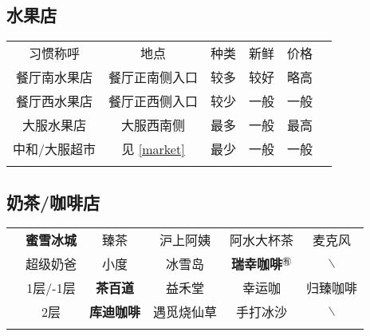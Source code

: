 \subsection[水果店]{水果店}
\begin{table}[H]
    \centering
    \begin{tabular}{|c|c|c|c|c|c|}
        \Xhline{1.2pt}
        习惯称呼    & 地点                     & 种类 & 新鲜 & 价格 \\
        \Xhline{1.2pt}
        餐厅南水果店  & 餐厅正南侧入口                & 较多 & 较好 & 略高 \\
        \hline
        餐厅西水果店  & 餐厅正西侧入口                & 较少 & 一般 & 一般 \\
        \hline
        大服水果店   & 大服西南侧                  & 最多 & 一般 & 最高 \\
        \hline
        中和/大服超市 & 见 \uline{\ref{market}} & 最少 & 一般 & 一般 \\
        \Xhline{1.2pt}
    \end{tabular}
\end{table}

\subsection[奶茶/咖啡店]{奶茶/咖啡店}
\begin{table}[H]
    \centering
    \begin{tabular}{|c|c|c|c|c|c|}
        \Xhline{1.2pt}
        \multirow{2}{*}{食堂} & \textbf{蜜雪冰城}       & 臻茶            & 沪上阿姨  %
                            & 阿水大杯茶               & 麦克风                   \\
        \cline{2-6}
                            & 超级奶爸                & 小度            & 冰雪岛   %
                            & \textbf{瑞幸咖啡}$^{㊒}$ & $\backslash$          \\
        \Xhline{1.2pt}
        \multirow{2}{*}{大服} & 1层/-1层              & \textbf{茶百道}  & 益禾堂   %
                            & 幸运咖                 & 归臻咖啡                  \\
        \cline{2-6}
                            & 2层                  & \textbf{库迪咖啡} & 遇觅烧仙草 %
                            & 手打冰沙                & $\backslash$          \\
        \Xhline{1.2pt}
    \end{tabular}
\end{table}

